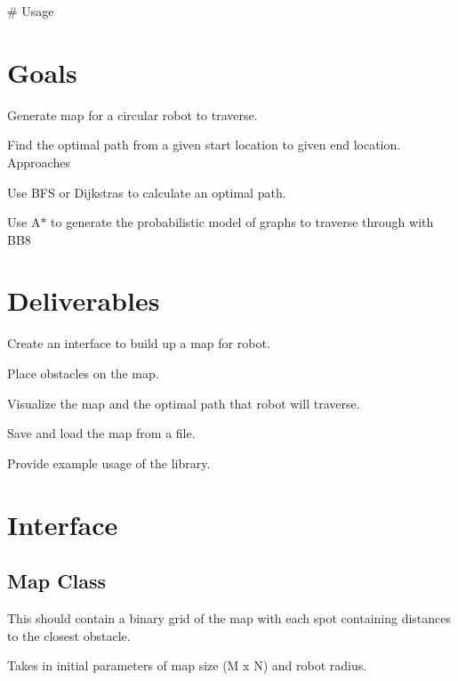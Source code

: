 \# Usage 
\begin{DoxyCode}{0}
\end{DoxyCode}


\section*{Goals}

Generate map for a circular robot to traverse.
\begin{DoxyItemize}
\item Find the optimal path from a given start location to given end location. Approaches
\item Use B\+FS or Dijkstra\textquotesingle{}s to calculate an optimal path.
\item Use A$\ast$ to generate the probabilistic model of graphs to traverse through with B\+B8
\end{DoxyItemize}

\section*{Deliverables}


\begin{DoxyItemize}
\item Create an interface to build up a map for robot.
\item Place obstacles on the map.
\item Visualize the map and the optimal path that robot will traverse.
\item Save and load the map from a file.
\item Provide example usage of the library.
\end{DoxyItemize}

\section*{Interface}

\subsection*{Map Class}

This should contain a binary grid of the map with each spot containing distances to the closest obstacle.
\begin{DoxyItemize}
\item Takes in initial parameters of map size (M x N) and robot radius.
\end{DoxyItemize}

